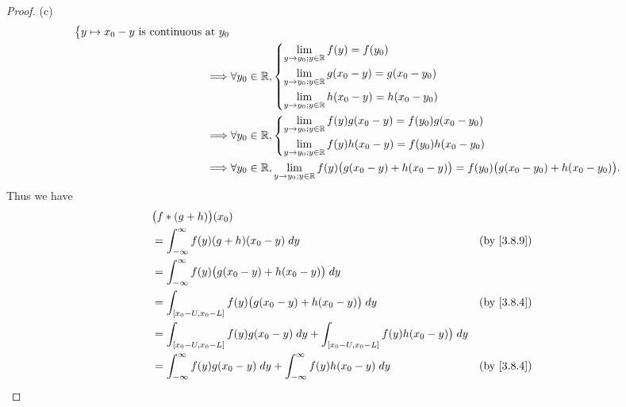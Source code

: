\begin{proof}{(c)}
\begin{align*}
\begin{dcases}
                                     y \mapsto x_0 - y \text{ is continuous at } y_0
                                   \end{dcases}                                                                     \\
    \implies & \forall y_0 \in \mathbb{R}, \begin{dcases}
                                     \lim_{y \to y_0 ; y \in \mathbb{R}} f(y) = f(y_0)             \\
                                     \lim_{y \to y_0 ; y \in \mathbb{R}} g(x_0 - y) = g(x_0 - y_0) \\
                                     \lim_{y \to y_0 ; y \in \mathbb{R}} h(x_0 - y) = h(x_0 - y_0)
                                   \end{dcases}                                                              \\
    \implies & \forall y_0 \in \mathbb{R}, \begin{dcases}
                                     \lim_{y \to y_0 ; y \in \mathbb{R}} f(y) g(x_0 - y) = f(y_0) g(x_0 - y_0) \\
                                     \lim_{y \to y_0 ; y \in \mathbb{R}} f(y) h(x_0 - y) = f(y_0) h(x_0 - y_0)
                                   \end{dcases}                                                  \\
    \implies & \forall y_0 \in \mathbb{R}, \lim_{y \to y_0 ; y \in \mathbb{R}} f(y) \big(g(x_0 - y) + h(x_0 - y)\big) = f(y_0) \big(g(x_0 - y_0) + h(x_0 - y_0)\big).
  \end{align*}
  Thus we have
  \begin{align*}
     & \big(f * (g + h)\big)(x_0)                                                                                               \\
     & = \int_{-\infty}^\infty f(y) (g + h)(x_0 - y) \; dy                                                      &  & \by{3.8.9} \\
     & = \int_{-\infty}^\infty f(y) \big(g(x_0 - y) + h(x_0 - y)\big) \; dy                                                     \\
     & = \int_{[x_0 - U, x_0 - L]} f(y) \big(g(x_0 - y) + h(x_0 - y)\big) \; dy                                 &  & \by{3.8.4} \\
     & = \int_{[x_0 - U, x_0 - L]} f(y) g(x_0 - y) \; dy + \int_{[x_0 - U, x_0 - L]} f(y) h(x_0 - y)\big) \; dy                 \\
     & = \int_{-\infty}^\infty f(y) g(x_0 - y) \; dy + \int_{-\infty}^\infty f(y) h(x_0 - y) \; dy              &  & \by{3.8.4} \\

\end{align*}
\end{proof}
